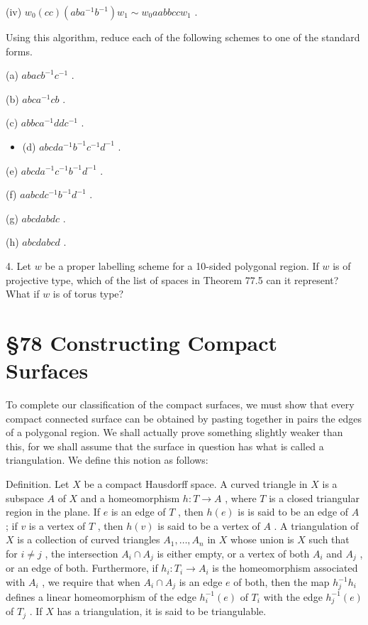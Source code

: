 (iv) \({w}_{0}\left( {cc}\right) \left( {{ab}{a}^{-1}{b}^{-1}}\right) {w}_{1} \sim  {w}_{0}{aabbcc}{w}_{1}\) .

Using this algorithm, reduce each of the following schemes to one of the standard forms.

(a) \({abac}{b}^{-1}{c}^{-1}\) .

(b) \({abc}{a}^{-1}{cb}\) .

(c) \({abbc}{a}^{-1}{dd}{c}^{-1}\) .

\begin{itemize}
\item (d) \({abcd}{a}^{-1}{b}^{-1}{c}^{-1}{d}^{-1}\) .
\end{itemize}

(e) \({abcd}{a}^{-1}{c}^{-1}{b}^{-1}{d}^{-1}\) .

(f) \({aabcd}{c}^{-1}{b}^{-1}{d}^{-1}\) .

(g) \({abcdabdc}\) .

(h) \({abcdabcd}\) .

4. Let \(w\) be a proper labelling scheme for a 10-sided polygonal region. If \(w\) is of projective type, which of the list of spaces in Theorem 77.5 can it represent? What if \(w\) is of torus type?

\section*{ \S 78 Constructing Compact Surfaces}

To complete our classification of the compact surfaces, we must show that every compact connected surface can be obtained by pasting together in pairs the edges of a polygonal region. We shall actually prove something slightly weaker than this, for we shall assume that the surface in question has what is called a triangulation. We define this notion as follows:

Definition. Let \(X\) be a compact Hausdorff space. A curved triangle in \(X\) is a subspace \(A\) of \(X\) and a homeomorphism \(h : T \rightarrow  A\) , where \(T\) is a closed triangular region in the plane. If \(e\) is an edge of \(T\) , then \(h\left( e\right)\) is is said to be an edge of \(A\) ; if \(v\) is a vertex of \(T\) , then \(h\left( v\right)\) is said to be a vertex of \(A\) . A triangulation of \(X\) is a collection of curved triangles \({A}_{1},\ldots ,{A}_{n}\) in \(X\) whose union is \(X\) such that for \(i \neq  j\) , the intersection \({A}_{i} \cap  {A}_{j}\) is either empty, or a vertex of both \({A}_{i}\) and \({A}_{j}\) , or an edge of both. Furthermore, if \({h}_{i} : {T}_{i} \rightarrow  {A}_{i}\) is the homeomorphism associated with \({A}_{i}\) , we require that when \({A}_{i} \cap  {A}_{j}\) is an edge \(e\) of both, then the map \({h}_{j}^{-1}{h}_{i}\) defines a linear homeomorphism of the edge \({h}_{i}^{-1}\left( e\right)\) of \({T}_{i}\) with the edge \({h}_{j}^{-1}\left( e\right)\) of \({T}_{j}\) . If \(X\) has a triangulation, it is said to be triangulable.

